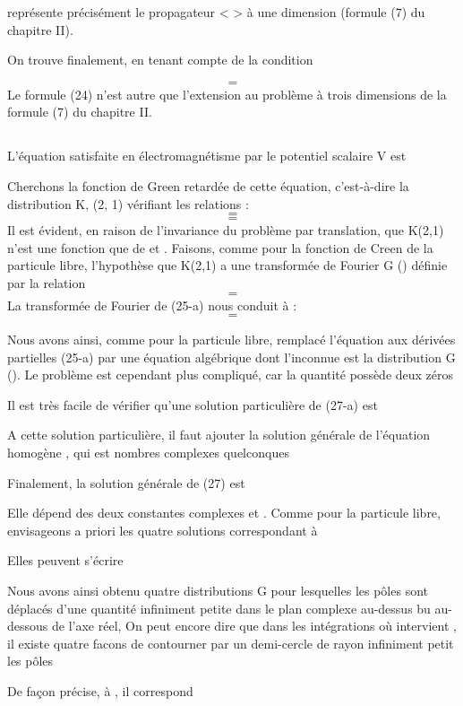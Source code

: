 représente précisément le propagateur <  > à une dimension
(formule (7) du chapitre II).

On trouve finalement, en tenant compte de la condition

\[
\tag{24}=
\]
Le formule (24) n'est autre que l'extension au problème à trois dimensions
de la formule (7) du chapitre II.

\subsection{}%

L'équation satisfaite en électromagnétisme par le potentiel
scalaire V est

Cherchons la fonction de Green retardée de cette équation, c'est-à-dire
la distribution K, (2, 1) vérifiant les relations :
\[
\tag{25-a}=
\]
\[
\tag{25-b}=
\]
Il est évident, en raison de l'invariance du problème par translation, que
K(2,1) n'est une fonction que de  et . Faisons, comme pour
la fonction de Creen de la particule libre, l'hypothèse que K(2,1) a une
transformée de Fourier G () définie par la relation
\[
\tag{26}=
\]
La transformée de Fourier de (25-a) nous conduit à : 
\[
\tag{27}=
\]
 
Nous avons ainsi, comme pour la particule libre, remplacé
l'équation aux dérivées partielles (25-a) par une équation algébrique
dont l'inconnue est la distribution G (). Le problème est cependant
plus compliqué, car la quantité possède deux zéros

Il est très facile de vérifier qu'une solution particulière
de (27-a) est

A cette solution particulière, il faut ajouter la solution générale de
l'équation homogène , qui est
 nombres complexes quelconques

Finalement, la solution générale de (27) est

Elle dépend des deux constantes complexes  et . Comme pour la particule
libre, envisageons a priori les quatre solutions correspondant à

Elles peuvent s'écrire

Nous avons ainsi obtenu quatre distributions G pour lesquelles les
pôles  sont déplacés d'une quantité infiniment petite dans le
plan complexe au-dessus bu au-dessous de l'axe réel, On peut encore dire
que dans les intégrations où intervient , il existe quatre facons
de contourner par un demi-cercle de rayon infiniment petit  les pôles

De façon précise,
à , il correspond

